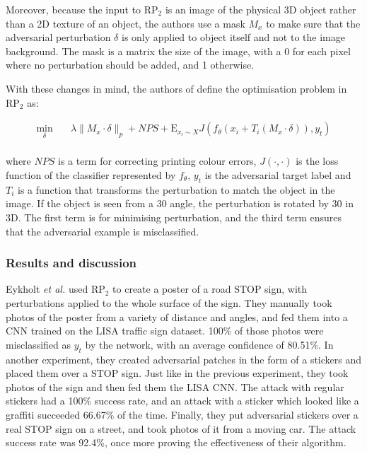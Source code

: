 Moreover, because the input to $\textrm{RP}_2$ is an image of the physical 3D object rather than a 2D texture of an object, the authors use a mask $M_x$ to make sure that the adversarial perturbation $\delta$ is only applied to object itself and not to the image background. The mask is a matrix the size of the image, with a 0 for each pixel where no perturbation should be added, and 1 otherwise. 

With these changes in mind, the authors of \cite{evtimov_road_signs} define the optimisation problem in $\textrm{RP}_2$ as:

\begin{equation}
\begin{aligned}
\min_{\delta} \quad & \lambda\|M_x \cdot \delta\|_p + NPS + \mathrm{E}_{x_i\sim X}J(f_\theta(x_i + T_i(M_x \cdot \delta)), y_t)\\
\label{eq:rp2}
\end{aligned}
\end{equation}

\noindent where $NPS$ is a term for correcting printing colour errors, $J(\cdot, \cdot)$ is the loss function of the classifier represented by $f_\theta$, $y_t$ is the adversarial target label and $T_i$ is a function that transforms the perturbation to match the object in the image. If the object is seen from a 30\degree{} angle, the perturbation is rotated by 30\degree{} in 3D. The first term is for minimising perturbation, and the third term ensures that the adversarial example is misclassified.

\subsubsection{Results and discussion}
    \label{subsubsec:rp2_results}

Eykholt \textit{et al.} used $\textrm{RP}_2$ to create a poster of a road STOP sign, with perturbations applied to the whole surface of the sign. They manually took photos of the poster from a variety of distance and angles, and fed them into a CNN trained on the LISA traffic sign dataset. 100\% of those photos were misclassified as $y_t$ by the network, with an average confidence of 80.51\%. In another experiment, they created adversarial patches in the form of a stickers and placed them over a STOP sign. Just like in the previous experiment, they took photos of the sign and then fed them the LISA CNN. The attack with regular stickers had a 100\% success rate, and an attack with a sticker which looked like a graffiti succeeded 66.67\% of the time. Finally, they put adversarial stickers over a real STOP sign on a street, and took photos of it from a moving car. The attack success rate was 92.4\%, once more proving the effectiveness of their algorithm.


